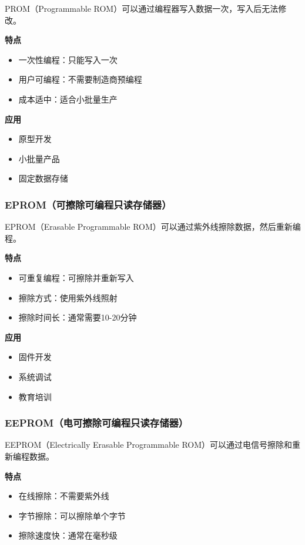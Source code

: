\documentclass{article}
\begin{document}
PROM（Programmable ROM）可以通过编程器写入数据一次，写入后无法修改。

\textbf{特点}
\begin{itemize}
    \item 一次性编程：只能写入一次
    \item 用户可编程：不需要制造商预编程
    \item 成本适中：适合小批量生产
\end{itemize}

\textbf{应用}
\begin{itemize}
    \item 原型开发
    \item 小批量产品
    \item 固定数据存储
\end{itemize}

\subsubsection{EPROM（可擦除可编程只读存储器）}

EPROM（Erasable Programmable ROM）可以通过紫外线擦除数据，然后重新编程。

\textbf{特点}
\begin{itemize}
    \item 可重复编程：可擦除并重新写入
    \item 擦除方式：使用紫外线照射
    \item 擦除时间长：通常需要10-20分钟
\end{itemize}

\textbf{应用}
\begin{itemize}
    \item 固件开发
    \item 系统调试
    \item 教育培训
\end{itemize}

\subsubsection{EEPROM（电可擦除可编程只读存储器）}

EEPROM（Electrically Erasable Programmable ROM）可以通过电信号擦除和重新编程数据。

\textbf{特点}
\begin{itemize}
    \item 在线擦除：不需要紫外线
    \item 字节擦除：可以擦除单个字节
    \item 擦除速度快：通常在毫秒级
\end{itemize}
\end{document}

